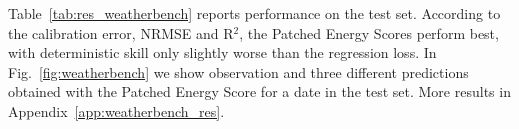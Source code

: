 \documentclass[twoside,11pt]{article}
\begin{document}
	Table~\ref{tab:res_weatherbench} reports performance on the test set. According to the calibration error, NRMSE and R$ ^2 $, the Patched Energy Scores perform best, with deterministic skill only slightly worse than the regression loss. 
	In Fig.~\ref{fig:weatherbench} we show observation and three different predictions obtained with the Patched Energy Score for a date in the test set. 
	More results in Appendix~\ref{app:weatherbench_res}.
	
	
	
	
	
\end{document}
